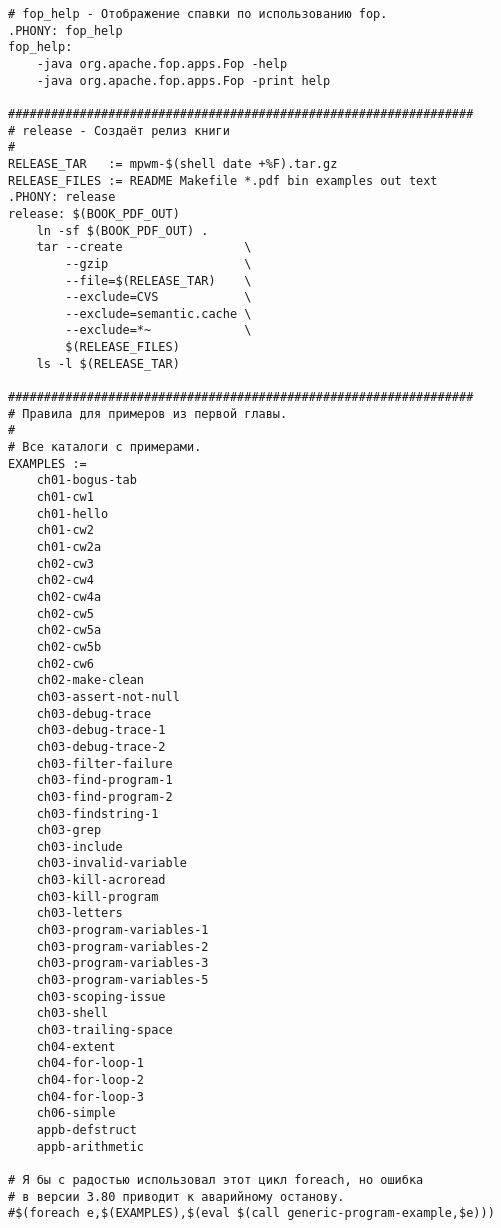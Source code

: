 \begin{verbatim}
# fop_help - Отображение спавки по использованию fop.
.PHONY: fop_help
fop_help:
    -java org.apache.fop.apps.Fop -help
    -java org.apache.fop.apps.Fop -print help

#################################################################
# release - Создаёт релиз книги
#
RELEASE_TAR   := mpwm-$(shell date +%F).tar.gz
RELEASE_FILES := README Makefile *.pdf bin examples out text
.PHONY: release
release: $(BOOK_PDF_OUT)
    ln -sf $(BOOK_PDF_OUT) .
    tar --create                 \
        --gzip                   \
        --file=$(RELEASE_TAR)    \
        --exclude=CVS            \
        --exclude=semantic.cache \
        --exclude=*~             \
        $(RELEASE_FILES)
    ls -l $(RELEASE_TAR)

#################################################################
# Правила для примеров из первой главы.
#
# Все каталоги с примерами.
EXAMPLES :=
    ch01-bogus-tab
    ch01-cw1
    ch01-hello
    ch01-cw2
    ch01-cw2a
    ch02-cw3
    ch02-cw4
    ch02-cw4a
    ch02-cw5
    ch02-cw5a
    ch02-cw5b
    ch02-cw6
    ch02-make-clean
    ch03-assert-not-null
    ch03-debug-trace
    ch03-debug-trace-1
    ch03-debug-trace-2
    ch03-filter-failure
    ch03-find-program-1
    ch03-find-program-2
    ch03-findstring-1
    ch03-grep
    ch03-include
    ch03-invalid-variable
    ch03-kill-acroread
    ch03-kill-program
    ch03-letters
    ch03-program-variables-1
    ch03-program-variables-2
    ch03-program-variables-3
    ch03-program-variables-5
    ch03-scoping-issue
    ch03-shell
    ch03-trailing-space
    ch04-extent
    ch04-for-loop-1
    ch04-for-loop-2
    ch04-for-loop-3
    ch06-simple
    appb-defstruct
    appb-arithmetic

# Я бы с радостью использовал этот цикл foreach, но ошибка
# в версии 3.80 приводит к аварийному останову.
#$(foreach e,$(EXAMPLES),$(eval $(call generic-program-example,$e)))


\end{verbatim}
